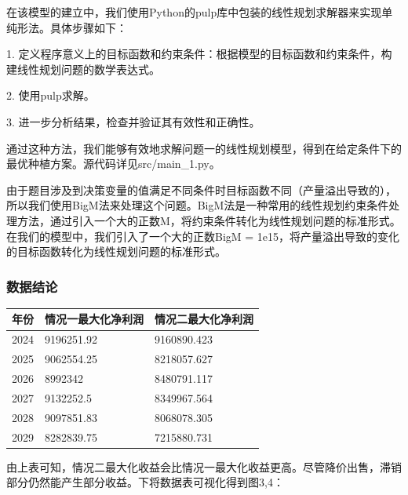 \documentclass{cumcmthesis}
\begin{document}
在该模型的建立中，我们使用Python的pulp库中包装的线性规划求解器来实现单纯形法。具体步骤如下：

1. 定义程序意义上的目标函数和约束条件：根据模型的目标函数和约束条件，构建线性规划问题的数学表达式。

2. 使用pulp求解。

3. 进一步分析结果，检查并验证其有效性和正确性。

通过这种方法，我们能够有效地求解问题一的线性规划模型，得到在给定条件下的最优种植方案。源代码详见src/main\_1.py。

由于题目涉及到决策变量的值满足不同条件时目标函数不同（产量溢出导致的），所以我们使用BigM法来处理这个问题。BigM法是一种常用的线性规划约束条件处理方法，通过引入一个大的正数M，将约束条件转化为线性规划问题的标准形式。在我们的模型中，我们引入了一个大的正数BigM = 1e15，将产量溢出导致的变化的目标函数转化为线性规划问题的标准形式。

\subsubsection{数据结论}

\begin{table}[H]
    \centering
    \begin{tabular}{|l|l|l|}
    \hline
    \textbf{年份} & \textbf{情况一最大化净利润} & \textbf{情况二最大化净利润}  \\ \hline
        2024 & 9196251.92 & 9160890.423  \\ \hline
        2025 & 9062554.25 & 8218057.627  \\ \hline
        2026 & 8992342 & 8480791.117  \\ \hline
        2027 & 9132252.5 & 8349967.564  \\ \hline
        2028 & 9097851.83 & 8068078.305  \\ \hline
        2029 & 8282839.75 & 7215880.731  \\ \hline
    \end{tabular}
\end{table}
由上表可知，情况二最大化收益会比情况一最大化收益更高。尽管降价出售，滞销部分仍然能产生部分收益。下将数据表可视化得到图3,4：
\end{document}
